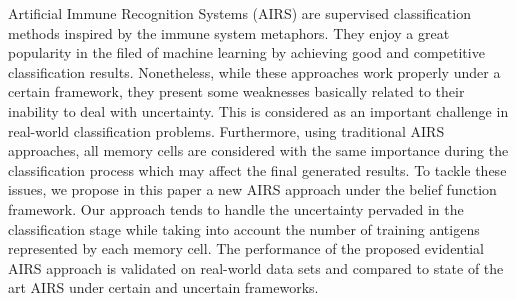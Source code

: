 






Artificial Immune Recognition Systems (AIRS) are  supervised
classification methods inspired by the immune system metaphors. They enjoy a great popularity in the filed of machine learning by achieving good and competitive classification results. Nonetheless, while these approaches work properly under a certain framework, they
present some weaknesses basically related to their inability to deal with uncertainty. This is considered as an important challenge in real-world classification problems. Furthermore, using traditional AIRS approaches, all memory cells  are considered with the same importance during the classification process which may affect the final generated results. To tackle these issues, we propose in this paper a new AIRS approach under the belief function framework. Our approach tends to handle the uncertainty pervaded in the classification stage while taking into account the number of training antigens represented by each memory
cell. The performance of the proposed
evidential AIRS approach is validated on real-world data sets and compared to state of the art AIRS under certain and uncertain frameworks.




